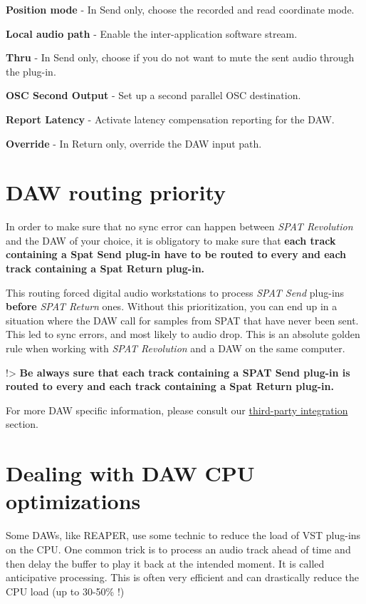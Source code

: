 \documentclass[
  letterpaper,
  DIV=11,
  numbers=noendperiod]{scrreport}
\begin{document}
\textbf{Position mode} - In Send only, choose the recorded and read
coordinate mode.

\textbf{Local audio path} - Enable the inter-application software
stream.

\textbf{Thru} - In Send only, choose if you do not want to mute the sent
audio through the plug-in.

\textbf{OSC Second Output} - Set up a second parallel OSC destination.

\textbf{Report Latency} - Activate latency compensation reporting for
the DAW.

\textbf{Override} - In Return only, override the DAW input path.

\hypertarget{daw-routing-priority}{%
\section{DAW routing priority}\label{daw-routing-priority}}

In order to make sure that no sync error can happen between \emph{SPAT
Revolution} and the DAW of your choice, it is obligatory to make sure
that \textbf{each track containing a Spat Send plug-in have to be routed
to every and each track containing a Spat Return plug-in.}

This routing forced digital audio workstations to process \emph{SPAT
Send} plug-ins \textbf{before} \emph{SPAT Return} ones. Without this
prioritization, you can end up in a situation where the DAW call for
samples from SPAT that have never been sent. This led to sync errors,
and most likely to audio drop. This is an absolute golden rule when
working with \emph{SPAT Revolution} and a DAW on the same computer.

!\textgreater{} \textbf{Be always sure that each track containing a SPAT
Send plug-in is routed to every and each track containing a Spat Return
plug-in.}

For more DAW specific information, please consult our
\href{Third_Party_Integration.md}{third-party integration} section.

\hypertarget{dealing-with-daw-cpu-optimizations}{%
\section{Dealing with DAW CPU
optimizations}\label{dealing-with-daw-cpu-optimizations}}

Some DAWs, like REAPER, use some technic to reduce the load of VST
plug-ins on the CPU. One common trick is to process an audio track ahead
of time and then delay the buffer to play it back at the intended
moment. It is called anticipative processing. This is often very
efficient and can drastically reduce the CPU load (up to 30-50\% !)
\end{document}
